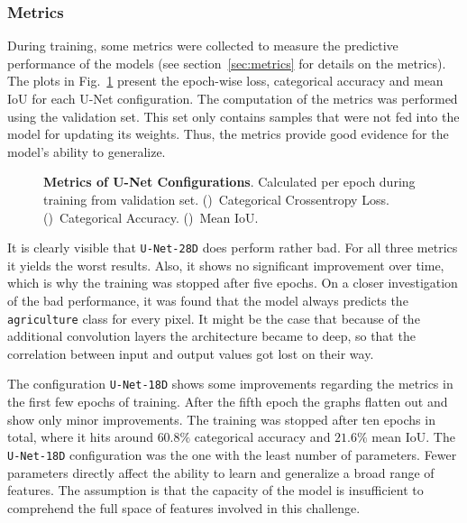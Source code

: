 \subsubsection{Metrics}
During training, some metrics were collected to measure the predictive performance of the models (see section~\ref{sec:metrics} for details on the metrics). The plots in Fig.~\ref{fig:unet_train_metrics} present the epoch-wise loss, categorical accuracy and mean IoU for each U-Net configuration. The computation of the metrics was performed using the validation set. This set only contains samples that were not fed into the model for updating its weights. Thus, the metrics provide good evidence for the model's ability to generalize.

\begin{figure}
    \newcommand{\UnetMetricsImageWidth}{0.32\textwidth}
    \centering
    
    \caption[Metrics of U-Net Configurations]
    {\textbf{Metrics of U-Net Configurations}. Calculated per epoch during training from validation set. ()~Categorical Crossentropy Loss. ()~Categorical Accuracy. ()~Mean IoU. }
    \label{fig:unet_train_metrics}
\end{figure}

It is clearly visible that \texttt{U-Net-28D} does perform rather bad. For all three metrics it yields the worst results. Also, it shows no significant improvement over time, which is why the training was stopped after five epochs. On a closer investigation of the bad performance, it was found that the model always predicts the \texttt{agriculture} class for every pixel. It might be the case that because of the additional convolution layers the architecture became to deep, so that the correlation between input and output values got lost on their way.

The configuration \texttt{U-Net-18D} shows some improvements regarding the metrics in the first few epochs of training. After the fifth epoch the graphs flatten out and show only minor improvements. The training was stopped after ten epochs in total, where it hits around $60.8\%$ categorical accuracy and $21.6\%$ mean IoU. The \texttt{U-Net-18D} configuration was the one with the least number of parameters. Fewer parameters directly affect the ability to learn and generalize a broad range of features. The assumption is that the capacity of the model is insufficient to comprehend the full space of features involved in this challenge.

